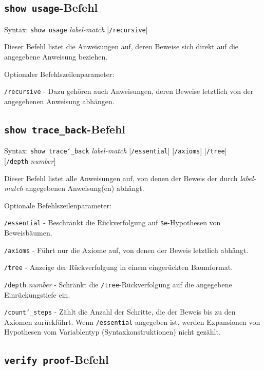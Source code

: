 \subsection{\texttt{show usage}-Befehl}

Syntax:  \texttt{show usage} {\em label-match} [\texttt{/recursive}]

Dieser Befehl listet die Anweisungen auf, deren Beweise sich direkt auf die angegebene Anweisung beziehen.

Optionaler Befehlszeilenparameter:

    \texttt{/recursive} - Dazu gehören auch Anweisungen, deren Beweise letztlich von der angegebenen Anweisung abhängen. 


\subsection{\texttt{show trace\_back}-Befehl}
   
Syntax:  \texttt{show trace{\char`\_}back} {\em label-match} [\texttt{/essential}] [\texttt{/axioms}]
    [\texttt{/tree}] {\\} [\texttt{/depth} {\em number}]

Dieser Befehl listet alle Anweisungen auf, von denen der Beweis der durch {\em label-match} angegebenen Anweisung(en) abhängt. 
    
Optionale Befehlszeilenparameter:

    \texttt{/essential} - Beschränkt die Rückverfolgung auf \texttt{\$e}-Hypothesen von Beweisbäumen.

    \texttt{/axioms} - Führt nur die Axiome auf, von denen der Beweis letztlich abhängt.

    \texttt{/tree} - Anzeige der Rückverfolgung in einem eingerückten Baumformat.

    \texttt{/depth} {\em number} - Schränkt die \texttt{/tree}-Rückverfolgung auf die angegebene Einrückungstiefe ein.

    \texttt{/count{\char`\_}steps} - Zählt die Anzahl der Schritte, die der Beweis bis zu den Axiomen zurückführt.  Wenn \texttt{/essential} angegeben ist, werden Expansionen von Hypothesen vom Variablentyp (Syntaxkonstruktionen) nicht gezählt. 


\subsection{\texttt{verify proof}-Befehl}

